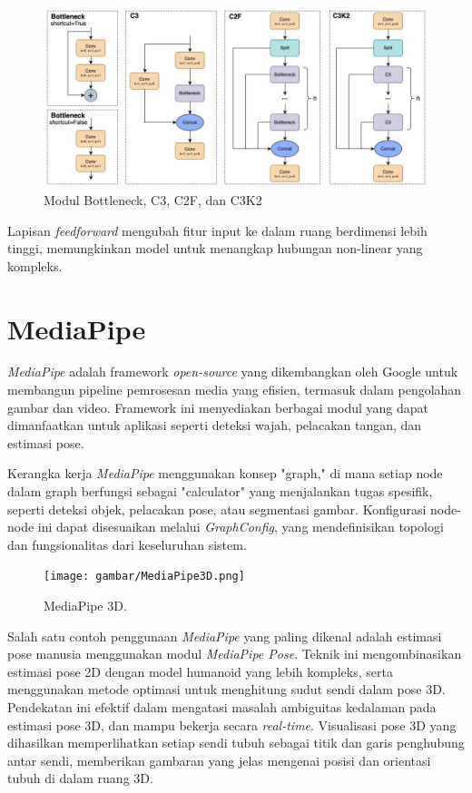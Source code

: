 \begin{figure}[H]
  \centering
  \includegraphics[scale=0.55]{gambar/C3k2.jpg}
  \caption{Modul Bottleneck, C3, C2F, dan C3K2}
  \label{fig:c3k2}
\end{figure}

Lapisan \emph{feedforward} mengubah fitur input ke dalam ruang berdimensi lebih tinggi, memungkinkan model untuk menangkap hubungan non-linear yang kompleks.


\section{MediaPipe}
\label{sec:MediaPipe}

\emph{MediaPipe} adalah framework \emph{open-source} yang dikembangkan oleh Google untuk membangun pipeline pemrosesan media yang efisien, termasuk dalam pengolahan gambar dan video. Framework ini menyediakan berbagai modul yang dapat dimanfaatkan untuk aplikasi seperti deteksi wajah, pelacakan tangan, dan estimasi pose.

Kerangka kerja \emph{MediaPipe} menggunakan konsep "graph," di mana setiap node dalam graph berfungsi sebagai "calculator" yang menjalankan tugas spesifik, seperti deteksi objek, pelacakan pose, atau segmentasi gambar. Konfigurasi node-node ini dapat disesuaikan melalui \emph{GraphConfig}, yang mendefinisikan topologi dan fungsionalitas dari keseluruhan sistem.

\begin{figure}[H]
  \centering
  \texttt{[image: gambar/MediaPipe3D.png]}
  \caption{MediaPipe 3D.}
  \label{fig:MediaPipe3D}
\end{figure}

Salah satu contoh penggunaan \emph{MediaPipe} yang paling dikenal adalah estimasi pose manusia menggunakan modul \emph{MediaPipe Pose}. Teknik ini mengombinasikan estimasi pose 2D dengan model humanoid yang lebih kompleks, serta menggunakan metode optimasi untuk menghitung sudut sendi dalam pose 3D. Pendekatan ini efektif dalam mengatasi masalah ambiguitas kedalaman pada estimasi pose 3D, dan mampu bekerja secara \emph{real-time}. Visualisasi pose 3D yang dihasilkan memperlihatkan setiap sendi tubuh sebagai titik dan garis penghubung antar sendi, memberikan gambaran yang jelas mengenai posisi dan orientasi tubuh di dalam ruang 3D.

